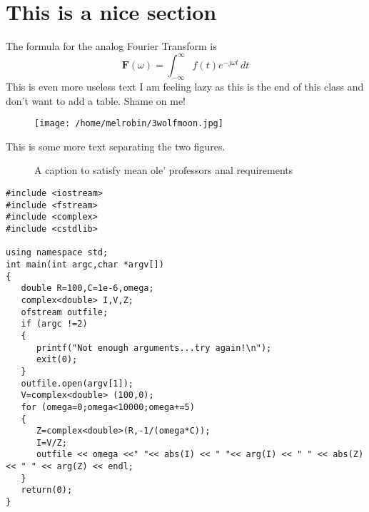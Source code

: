 \documentclass{article}
\begin{document}
\section{This is a nice section}
The formula for the analog Fourier Transform is 
\begin{equation*}
\mathbf F(\omega)=\int_{-\infty}^\infty f(t)e^{-j\omega t}\,dt
\end{equation*}
This is even more useless text
I am feeling lazy as this is the end of this class and don't want to add a table.  Shame on me!
\begin{figure}[h]
\texttt{[image: /home/melrobin/3wolfmoon.jpg]}
\end{figure}

This is some more text separating the two figures.

\begin{figure}

\caption{A caption to satisfy mean ole' professors anal requirements}
\end{figure} 
\begin{verbatim}
#include <iostream>
#include <fstream>
#include <complex>
#include <cstdlib>

using namespace std;
int main(int argc,char *argv[])
{
   double R=100,C=1e-6,omega;
   complex<double> I,V,Z;
   ofstream outfile;
   if (argc !=2)
   {
      printf("Not enough arguments...try again!\n");
      exit(0);
   } 
   outfile.open(argv[1]);
   V=complex<double> (100,0);
   for (omega=0;omega<10000;omega+=5)
   {
      Z=complex<double>(R,-1/(omega*C));
      I=V/Z;
      outfile << omega <<" "<< abs(I) << " "<< arg(I) << " " << abs(Z) << " " << arg(Z) << endl;
   }
   return(0);
}
\end{verbatim}
\end{document}
